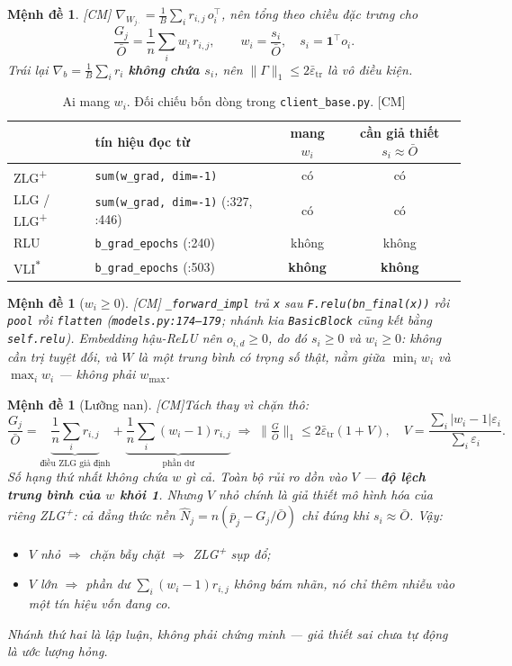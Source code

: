 \documentclass[11pt,a4paper]{article}
\newtheorem{menhde}[dinhly]{Mệnh đề}
\theoremstyle{remark}
\newcommand{\one}{\mathbf{1}}
\newcommand{\epstr}{\bar\varepsilon_{\mathrm{tr}}}
\newcommand{\code}[1]{\texttt{\small #1}}
\newcommand{\CM}{\textsf{[CM]}}
\begin{document}
\begin{menhde} \CM
$\nabla_{W_{j\cdot}}=\frac1B\sum_i r_{i,j}\,o_i^\top$, nên tổng theo chiều đặc
trưng cho
\[
  \frac{G_j}{\bar O}=\frac1n\sum_i w_i\,r_{i,j},
  \qquad w_i=\frac{s_i}{\bar O},\quad s_i=\one^\top o_i .
\]
Trái lại $\nabla_b=\frac1B\sum_i r_i$ \textbf{không chứa $s_i$}, nên
$\|\Gamma\|_1\le2\epstr$ là vô điều kiện.
\end{menhde}

\begin{table}[htbp]
\centering
\caption{Ai mang $w_i$. Đối chiếu bốn dòng trong \code{client\_base.py}. \CM}
\label{tab:mangw}
\small
\begin{tabular}{@{}llcc@{}}
\toprule
 & \textbf{tín hiệu đọc từ} & mang $w_i$ & cần giả thiết $s_i\approx\bar O$ \\
\midrule
ZLG\textsuperscript{+}        & \code{sum(w\_grad, dim=-1)} & có & có \\
LLG / LLG\textsuperscript{+}  & \code{sum(w\_grad, dim=-1)} (:327, :446) & có & có \\
RLU                           & \code{b\_grad\_epochs} (:240) & không & không \\
VLI\textsuperscript{$*$}      & \code{b\_grad\_epochs} (:503) & \textbf{không} & \textbf{không} \\
\bottomrule
\end{tabular}
\end{table}

\begin{menhde}[$w_i\ge0$] \CM
\code{\_forward\_impl} trả \code{x} sau \code{F.relu(bn\_final(x))} rồi
\code{pool} rồi \code{flatten} (\code{models.py:174--179}; nhánh kia
\code{BasicBlock} cũng kết bằng \code{self.relu}). Embedding hậu-ReLU nên
$o_{i,d}\ge0$, do đó $s_i\ge0$ và $w_i\ge0$: không cần trị tuyệt đối, và $W$ là
một \emph{trung bình có trọng số} thật, nằm giữa $\min_i w_i$ và $\max_i w_i$ ---
không phải $w_{\max}$.
\end{menhde}

\begin{menhde}[Lưỡng nan] \CM\label{md:luongnan}
Tách thay vì chặn thô:
\[
  \frac{G_j}{\bar O}
  =\underbrace{\frac1n\sum_i r_{i,j}}_{\text{điều ZLG giả định}}
  +\underbrace{\frac1n\sum_i (w_i-1)r_{i,j}}_{\text{phần dư}}
  \;\Longrightarrow\;
  \Big\|\tfrac{G}{\bar O}\Big\|_1\le 2\epstr(1+V),
  \quad V=\frac{\sum_i|w_i-1|\varepsilon_i}{\sum_i\varepsilon_i}.
\]
Số hạng thứ nhất \emph{không chứa $w$ gì cả}. Toàn bộ rủi ro dồn vào $V$ ---
\textbf{độ lệch trung bình của $w$ khỏi 1}. Nhưng $V$ nhỏ \emph{chính là giả
thiết mô hình hóa của riêng ZLG\textsuperscript{+}}: cả đẳng thức nền
$\hat N_j=n(\bar p_j-G_j/\bar O)$ chỉ đúng khi $s_i\approx\bar O$. Vậy:
\begin{itemize}
\item $V$ nhỏ $\Rightarrow$ chặn bẫy chặt $\Rightarrow$ ZLG\textsuperscript{+} sụp đổ;
\item $V$ lớn $\Rightarrow$ phần dư $\sum_i(w_i-1)r_{i,j}$ \emph{không bám nhãn},
nó chỉ thêm nhiễu vào một tín hiệu vốn đang co.
\end{itemize}
Nhánh thứ hai là \emph{lập luận}, không phải chứng minh --- giả thiết sai chưa
tự động là ước lượng hỏng.
\end{menhde}
\end{document}
